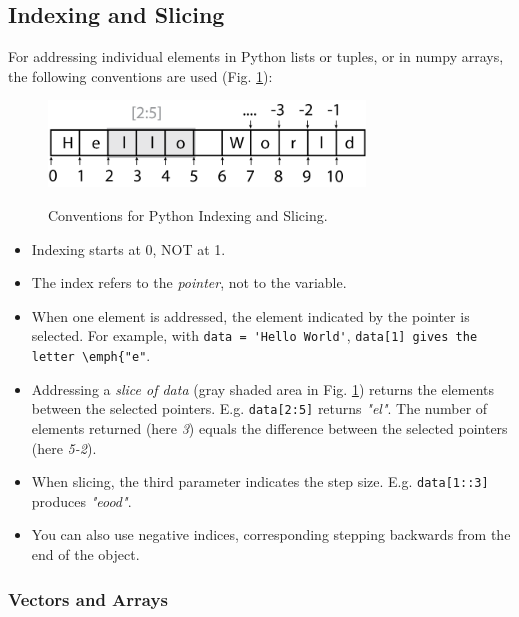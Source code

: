 \subsection{Indexing and Slicing}

For addressing individual elements in Python lists or tuples, or in numpy arrays, the following conventions are used (Fig. \ref{fig:indexing}):

\begin{figure}[H]
  \centering
  \includegraphics[width=0.75\textwidth]{../Images/IndexingAndSlicing.png}\\
  \caption{Conventions for Python Indexing and Slicing.}
  \label{fig:indexing}
\end{figure}

\begin{itemize}
  \item Indexing starts at 0, NOT at 1.
  \item The index refers to the \emph{pointer}, not to the variable.
  \item When one element is addressed, the element indicated by the pointer is selected. For example, with \lstinline{data = 'Hello World'}, \lstinline{data[1] gives the letter \emph{"e"}.
  \item Addressing a \emph{slice of data} (gray shaded area in Fig. \ref{fig:indexing}) returns the elements between the selected pointers.
        E.g. \lstinline{data[2:5]} returns \emph{"el"}. The number of elements returned (here \emph{3}) equals the difference between the selected pointers (here \emph{5-2}).
  \item When slicing, the third parameter indicates the step size. E.g. \lstinline{data[1::3]} produces \emph{"eood"}.
  \item You can also use negative indices, corresponding stepping backwards from the end of the object.
\end{itemize}

\subsubsection{Vectors and Arrays}

